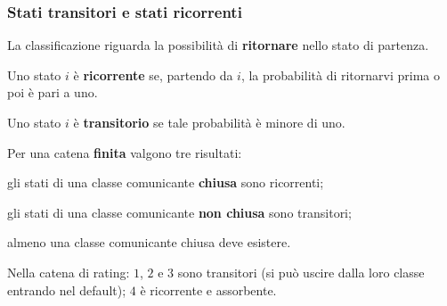 \begin{frame}%
%

\frametitle{Stati transitori e stati ricorrenti}%
%

%


La classificazione riguarda la possibilit\`{a} di \textbf{ritornare} nello
stato di partenza.

\medskip

\begin{stepitemize}
\item Uno stato $i$ \`{e} \textbf{ricorrente} se, partendo da $i$, la
probabilit\`{a} di ritornarvi prima o poi \`{e} pari a uno.

\item Uno stato $i$ \`{e} \textbf{transitorio} se tale probabilit\`{a} \`{e}
minore di uno.
\end{stepitemize}

\medskip

Per una catena \textbf{finita} valgono tre risultati:

\begin{stepitemize}
\item gli stati di una classe comunicante \textbf{chiusa} sono ricorrenti;

\item gli stati di una classe comunicante \textbf{non chiusa} sono transitori;

\item almeno una classe comunicante chiusa deve esistere.
\end{stepitemize}

\medskip

\begin{center}
{\small Nella catena di rating: $1$, $2$ e $3$ sono transitori (si pu\`{o}
uscire dalla loro classe entrando nel default); $4$ \`{e} ricorrente e
assorbente.}
\end{center}

%

\transboxout
\end{frame}%



